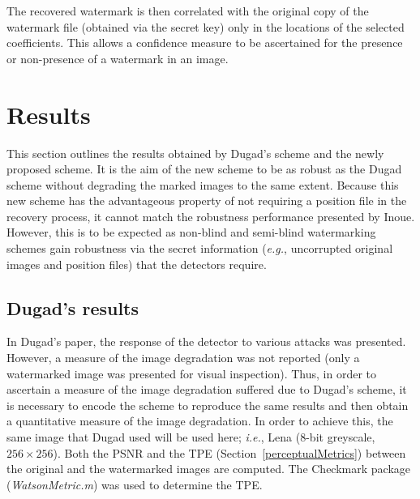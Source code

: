 \documentclass[12pt]{report}
\begin{document}
The recovered watermark is then correlated with the original copy of the
watermark file (obtained via the secret key) only in the 
locations of the selected coefficients. This allows a confidence measure
to be ascertained for the presence or non-presence of a watermark in an 
image.

\section{Results}
This section outlines the results obtained by Dugad's scheme and the newly 
proposed scheme. It is the aim of the new scheme to be as robust as
the Dugad scheme without degrading the marked images to the same extent. 
Because this new scheme has the advantageous property of not requiring a
position file in the recovery process, it cannot match the robustness
performance presented by Inoue. However, this is to be expected as 
non-blind and semi-blind watermarking schemes gain robustness via
the secret information (\emph{e.g.}, uncorrupted original images and position files)
that the detectors require.

\subsection{Dugad's results}
In Dugad's paper, the response of the detector to various attacks was presented.
However, a measure of the image degradation was not reported (only a watermarked
image was presented for visual inspection). Thus, in order to ascertain a measure
of the image degradation suffered due to Dugad's scheme, it is necessary to 
encode the scheme to reproduce the same results and then obtain a quantitative
measure of the image degradation. In order to achieve this, the same image 
that Dugad used will be used here; \emph{i.e.}, Lena (8-bit greyscale, $256 \times 256$). Both
the PSNR and the TPE (Section~\ref{perceptualMetrics}) between the original and
the watermarked images are computed. 
The Checkmark package \cite{ChkMrk:pereiraDI} (\emph{WatsonMetric.m}) was used to determine the TPE.
\end{document}
